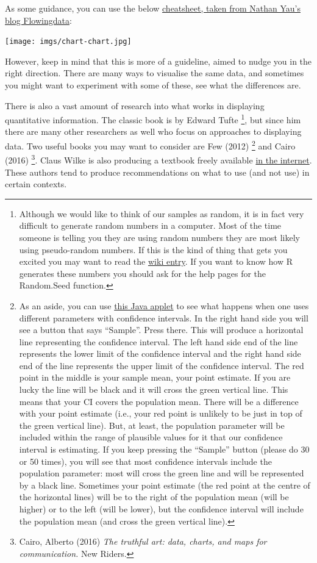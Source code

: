 \documentclass[
]{book}
\begin{document}
As some guidance, you can use the below \href{https://flowingdata.com/2009/01/15/flow-chart-shows-you-what-chart-to-use/}{cheatsheet, taken from Nathan Yau's blog Flowingdata}:

\texttt{[image: imgs/chart-chart.jpg]}

However, keep in mind that this is more of a guideline, aimed to nudge you in the right direction. There are many ways to visualise the same data, and sometimes you might want to experiment with some of these, see what the differences are.

There is also a vast amount of research into what works in displaying quantitative information. The classic book is by Edward Tufte \footnote{Although we would like to think of our samples as random, it is in fact very difficult to generate random numbers in a computer. Most of the time someone is telling you they are using random numbers they are most likely using pseudo-random numbers. If this is the kind of thing that gets you excited you may want to read the \href{http://en.wikipedia.org/wiki/Random_number_generation\#.22True.22_random_numbers_vs._pseudo-random_numbers}{wiki entry}. If you want to know how R generates these numbers you should ask for the help pages for the Random.Seed function.}, but since him there are many other researchers as well who focus on approaches to displaying data. Two useful books you may want to consider are Few (2012) \footnote{As an aside, you can use \href{http://bcs.whfreeman.com/ips4e/cat_010/applets/confidenceinterval.html}{this Java applet} to see what happens when one uses different parameters with confidence intervals. In the right hand side you will see a button that says ``Sample''. Press there. This will produce a horizontal line representing the confidence interval. The left hand side end of the line represents the lower limit of the confidence interval and the right hand side end of the line represents the upper limit of the confidence interval. The red point in the middle is your sample mean, your point estimate. If you are lucky the line will be black and it will cross the green vertical line. This means that your CI covers the population mean. There will be a difference with your point estimate (i.e., your red point is unlikely to be just in top of the green vertical line). But, at least, the population parameter will be included within the range of plausible values for it that our confidence interval is estimating. If you keep pressing the ``Sample'' button (please do 30 or 50 times), you will see that most confidence intervals include the population parameter: most will cross the green line and will be represented by a black line. Sometimes your point estimate (the red point at the centre of the horizontal lines) will be to the right of the population mean (will be higher) or to the left (will be lower), but the confidence interval will include the population mean (and cross the green vertical line).} and Cairo (2016) \footnote{Cairo, Alberto (2016) \emph{The truthful art: data, charts, and maps for communication.} New Riders.}. Claus Wilke is also producing a textbook freely available \href{https://serialmentor.com/dataviz/}{in the internet}.
These authors tend to produce recommendations on what to use (and not use) in certain contexts.
\end{document}
